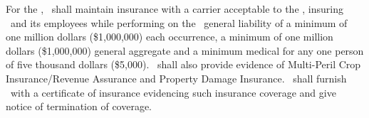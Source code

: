 For the \termoflease, \lessee\ shall maintain insurance with a carrier acceptable to the \lessor, insuring \lessee\ and its employees while performing on the \property\ general liability of a minimum of one million dollars (\$1,000,000) each occurrence, a minimum of one million dollars (\$1,000,000) general aggregate and a minimum medical for any one person of five thousand dollars (\$5,000). \lessee\ shall also provide evidence of Multi-Peril Crop Insurance/Revenue Assurance and Property Damage Insurance. \lessee\ shall furnish \lessor\ with a certificate of insurance evidencing such insurance coverage and give notice of termination of coverage.
